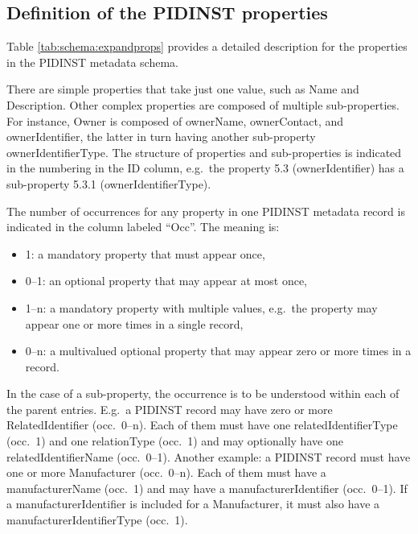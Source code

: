 \documentclass[titlepage=true,twoside=false,DIV=13]{scrartcl}
\begin{document}
\subsection{Definition of the PIDINST properties}

Table \ref{tab:schema:expandprops} provides a detailed description for
the properties in the PIDINST metadata schema.

There are simple properties that take just one value, such as Name and
Description.  Other complex properties are composed of multiple
sub-properties.  For instance, Owner is composed of ownerName,
ownerContact, and ownerIdentifier, the latter in turn having another
sub-property ownerIdentifierType.  The structure of properties and
sub-properties is indicated in the numbering in the ID column,
e.g.\ the property 5.3 (ownerIdentifier) has a sub-property 5.3.1
(ownerIdentifierType).

The number of occurrences for any property in one PIDINST metadata
record is indicated in the column labeled ``Occ''.  The meaning is:
\begin{itemize}
\item 1: a mandatory property that must appear once,
\item 0--1: an optional property that may appear at most once,
\item 1--n: a mandatory property with multiple values, e.g.\ the
  property may appear one or more times in a single record,
\item 0--n: a multivalued optional property that may appear zero
  or more times in a record.
\end{itemize}
In the case of a sub-property, the occurrence is to be understood
within each of the parent entries.  E.g.\ a PIDINST record may have
zero or more RelatedIdentifier (occ.\ 0--n).  Each of them must have
one relatedIdentifierType (occ.\ 1) and one relationType (occ.\ 1) and
may optionally have one relatedIdentifierName (occ.\ 0--1).  Another
example: a PIDINST record must have one or more Manufacturer
(occ.\ 0--n).  Each of them must have a manufacturerName (occ.\ 1) and
may have a manufacturerIdentifier (occ.\ 0--1).  If a
manufacturerIdentifier is included for a Manufacturer, it must also
have a manufacturerIdentifierType (occ.\ 1).

\newlength{\idcolw}\settowidth{\idcolw}{5.3.1}
\newlength{\propcolw}\settowidth{\propcolw}{instrumentTypeIdentifierType}
\newlength{\occcolw}
\newlength{\valcolw}\settowidth{\valcolw}{Controlled list of values:}
\setlength{\defcolw}{\textwidth}
\addtolength{\defcolw}{-\idcolw}
\addtolength{\defcolw}{-\propcolw}
\addtolength{\defcolw}{-\occcolw}
\addtolength{\defcolw}{-\valcolw}
\addtolength{\defcolw}{-10\tabcolsep}
\end{document}
